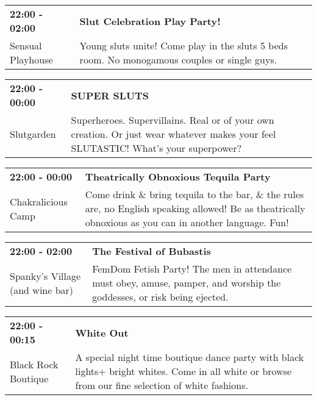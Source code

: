 \begin{tabular}{ p{1in} p{2.2in} }
    \textbf{22:00 - 02:00} & \textbf{Slut Celebration Play Party!} \\
    Sensual Playhouse \newline  & Young sluts unite! Come play in the sluts 5 beds room. No monogamous couples or single guys. \\
    \hline 
\end{tabular}
    
\begin{tabular}{ p{1in} p{2.2in} }
    \textbf{22:00 - 00:00} & \textbf{SUPER SLUTS} \\
    Slutgarden \newline  & Superheroes. Supervillains. Real or of your own creation. Or just wear whatever makes your feel SLUTASTIC! What's your superpower? \\
    \hline 
\end{tabular}
    
\begin{tabular}{ p{1in} p{2.2in} }
    \textbf{22:00 - 00:00} & \textbf{Theatrically Obnoxious Tequila Party} \\
    Chakralicious Camp \newline  & Come drink \& bring tequila to the bar, \& the rules are, no English speaking allowed! Be as theatrically obnoxious as you can in another language. Fun! \\
    \hline 
\end{tabular}
    
\begin{tabular}{ p{1in} p{2.2in} }
    \textbf{22:00 - 02:00} & \textbf{The Festival of Bubastis} \\
    Spanky's Village (and wine bar) \newline  & FemDom Fetish Party!  The men in attendance must obey, amuse, pamper, and worship the goddesses, or risk being ejected. \\
    \hline 
\end{tabular}
    
\begin{tabular}{ p{1in} p{2.2in} }
    \textbf{22:00 - 00:15} & \textbf{White Out} \\
    Black Rock Boutique \newline  & A special night time boutique dance party with black lights+ bright whites. Come in all white or browse from our fine selection of white fashions. \\
    \hline 
\end{tabular}
    
